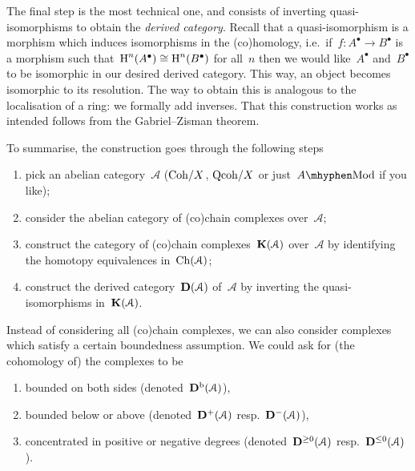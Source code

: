 \documentclass[10pt,a4paper]{article}
\begin{document}
The final step is the most technical one, and consists of inverting quasi-isomorphisms to obtain the \emph{derived category}. Recall that a quasi-isomorphism is a morphism which induces isomorphisms in the (co)homology, i.e.\ if~$f\colon A^\bullet\to B^\bullet$ is a morphism such that~$\operatorname{H}^n(A^\bullet)\cong\operatorname{H}^n(B^\bullet)$ for all~$n$ then we would like~$A^\bullet$ and~$B^\bullet$ to be isomorphic in our desired derived category. This way, an object becomes isomorphic to its resolution. The way to obtain this is analogous to the localisation of a ring: we formally add inverses. That this construction works as intended follows from the Gabriel--Zisman theorem.

To summarise, the construction goes through the following steps
\begin{enumerate}
  \item pick an abelian category~$\mathcal{A}$ ($\mathrm{Coh}/X$, $\mathrm{Qcoh}/X$ or just~$A\mhyphen\mathrm{Mod}$ if you like);
  \item consider the abelian category of (co)chain complexes over~$\mathcal{A}$;
  \item construct the category of (co)chain complexes~$\mathbf{K}(\mathcal{A})$ over~$\mathcal{A}$ by identifying the homotopy equivalences in~$\operatorname{Ch}(\mathcal{A})$;
  \item construct the derived category~$\mathbf{D}(\mathcal{A})$ of~$\mathcal{A}$ by inverting the quasi-isomorphisms in~$\mathbf{K}(\mathcal{A})$.
\end{enumerate}
Instead of considering all (co)chain complexes, we can also consider complexes which satisfy a certain boundedness assumption. We could ask for (the cohomology of) the complexes to be
\begin{enumerate}
  \item bounded on both sides (denoted~$\mathbf{D}^{\mathrm{b}}(\mathcal{A})$),
  \item bounded below or above (denoted~$\mathbf{D}^+(\mathcal{A})$ resp.\ $\mathbf{D}^-(\mathcal{A})$),
  \item concentrated in positive or negative degrees (denoted~$\mathbf{D}^{\geq 0}(\mathcal{A})$ resp.\ $\mathbf{D}^{\leq 0}(\mathcal{A})$).
\end{enumerate}
\end{document}
